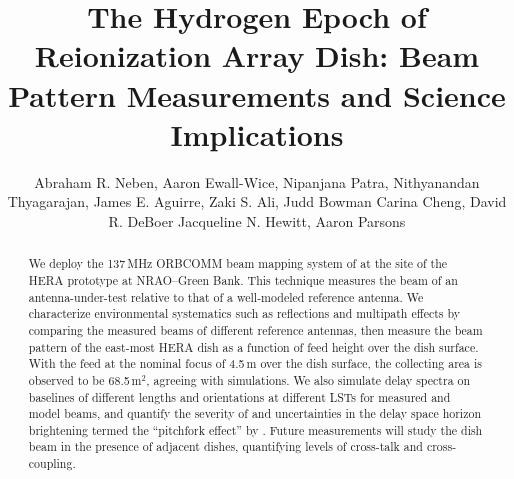 \documentclass{emulateapj}
\begin{document}
\title{The Hydrogen Epoch of Reionization Array Dish: Beam Pattern Measurements and Science Implications}


\author{Abraham R. Neben,
Aaron Ewall-Wice,
Nipanjana Patra,
Nithyanandan Thyagarajan,
James E. Aguirre,
Zaki S. Ali,
Judd Bowman
Carina Cheng,
David R. DeBoer
Jacqueline N. Hewitt,
Aaron Parsons}




\begin{abstract}
We deploy the 137\,MHz ORBCOMM beam mapping system of \citet{neben15} at the site of the HERA prototype at NRAO--Green Bank. This technique measures the beam of an antenna-under-test relative to that of a well-modeled reference antenna. We characterize environmental systematics such as reflections and multipath effects by comparing the measured beams of different reference antennas, then measure the beam pattern of the east-most HERA dish as a function of feed height over the dish surface. With the feed at the nominal focus of 4.5\,m over the dish surface, the collecting area is observed to be 68.5\,m$^2$, agreeing with simulations. We also simulate delay spectra on baselines of different lengths and orientations at different LSTs for measured and model beams, and quantify the severity of and uncertainties in the delay space horizon brightening termed the ``pitchfork effect'' by \citet{nithya15}. Future measurements will study the dish beam in the presence of adjacent dishes, quantifying levels of cross-talk and cross-coupling.
\end{abstract}
\end{document}

